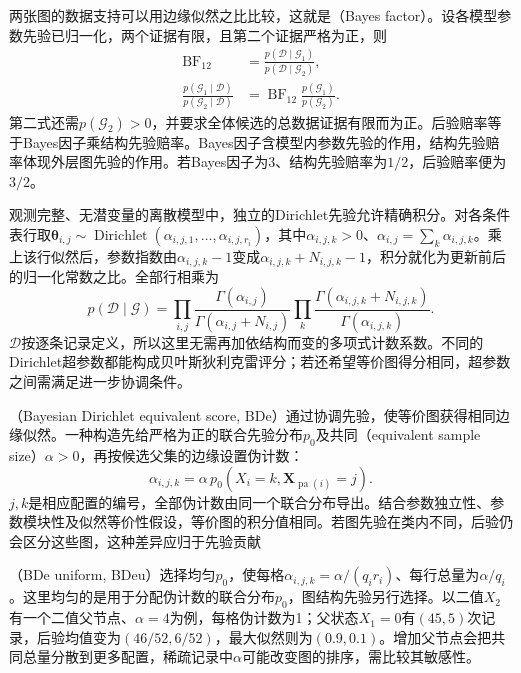 两张图的数据支持可以用边缘似然之比比较，这就是（Bayes factor）。设各模型参数先验已归一化，两个证据有限，且第二个证据严格为正，则
\begin{equation}
  \begin{aligned}
    \operatorname{BF}_{12}
      &=\frac{p(\mathcal{D}\mid\mathcal{G}_1)}
              {p(\mathcal{D}\mid\mathcal{G}_2)},\\
    \frac{p(\mathcal{G}_1\mid\mathcal{D})}
         {p(\mathcal{G}_2\mid\mathcal{D})}
      &=\operatorname{BF}_{12}
        \frac{p(\mathcal{G}_1)}{p(\mathcal{G}_2)}.
  \end{aligned}
  \label{eq:pgm-structure-learning-bayes-factor}
\end{equation}
第二式还需$p(\mathcal{G}_2)>0$，并要求全体候选的总数据证据有限而为正。后验赔率等于Bayes因子乘结构先验赔率。Bayes因子含模型内参数先验的作用，结构先验赔率体现外层图先验的作用。若Bayes因子为$3$、结构先验赔率为$1/2$，后验赔率便为$3/2$。

观测完整、无潜变量的离散模型中，独立的Dirichlet先验允许精确积分。对各条件表行取$\bm{\theta}_{i,j}\sim\operatorname{Dirichlet}(\alpha_{i,j,1},\ldots,\alpha_{i,j,r_i})$，其中$\alpha_{i,j,k}>0$、$\alpha_{i,j}=\sum_k\alpha_{i,j,k}$。乘上该行似然后，参数指数由$\alpha_{i,j,k}-1$变成$\alpha_{i,j,k}+N_{i,j,k}-1$，积分就化为更新前后的归一化常数之比。全部行相乘为
\begin{equation}
  p(\mathcal{D}\mid\mathcal{G})
  =\prod_{i,j}
    \frac{\Gamma(\alpha_{i,j})}
         {\Gamma(\alpha_{i,j}+N_{i,j})}
    \prod_k
    \frac{\Gamma(\alpha_{i,j,k}+N_{i,j,k})}
         {\Gamma(\alpha_{i,j,k})}.
  \label{eq:pgm-structure-learning-dirichlet}
\end{equation}
$\mathcal{D}$按逐条记录定义，所以这里无需再加依结构而变的多项式计数系数。不同的Dirichlet超参数都能构成贝叶斯狄利克雷评分；若还希望等价图得分相同，超参数之间需满足进一步协调条件。

（Bayesian Dirichlet equivalent score, BDe）通过协调先验，使等价图获得相同边缘似然。一种构造先给严格为正的联合先验分布$p_0$及共同（equivalent sample size）$\alpha>0$，再按候选父集的边缘设置伪计数：
\[
  \alpha_{i,j,k}
  =\alpha\,p_0(X_i=k,\bm{X}_{\operatorname{pa}(i)}=j).
\]
$j,k$是相应配置的编号，全部伪计数由同一个联合分布导出。结合参数独立性、参数模块性及似然等价性假设，等价图的积分值相同。若图先验在类内不同，后验仍会区分这些图，这种差异应归于先验贡献

（BDe uniform, BDeu）选择均匀$p_0$，使每格$\alpha_{i,j,k}=\alpha/(q_i r_i)$、每行总量为$\alpha/q_i$。这里均匀的是用于分配伪计数的联合分布$p_0$，图结构先验另行选择。以二值$X_2$有一个二值父节点、$\alpha=4$为例，每格伪计数为1；父状态$X_1=0$有$(45,5)$次记录，后验均值变为$(46/52,6/52)$，最大似然则为$(0.9,0.1)$。增加父节点会把共同总量分散到更多配置，稀疏记录中$\alpha$可能改变图的排序，需比较其敏感性。

